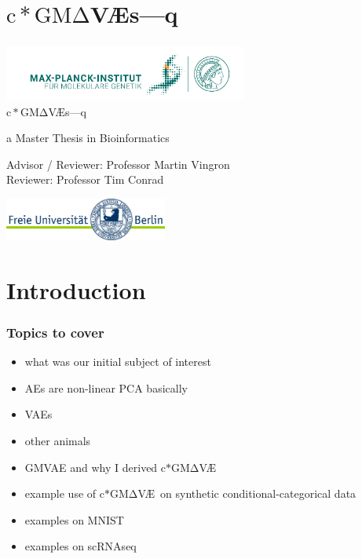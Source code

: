 \documentclass[final]{beamer}
\title{\scgmvae}{}
\author{Kolb, Yiftach}
\newcommand{\scgmvae}{$\mathrm{c}{\ast}\mathrm{GM\Delta}$V{\AE}s---q}
\newcommand{\gmvae}{c$\ast$GM$\mathrm{\Delta}$V\AE~}
\begin{document}
\maketitle

\section{\scgmvae}

\begin{frame}
\frametitle{}
\begin{center}
{\includegraphics[width=0.60\textwidth]{images/MPIMG_RGB_gruen.png}}\\
\vspace*{1cm}
\large
\scgmvae

\normalsize
a Master Thesis in Bioinformatics
\vspace{0.2cm}

Advisor / Reviewer: Professor Martin Vingron\\
Reviewer: Professor Tim Conrad

\vfill



\vfill
{\includegraphics[width=0.4\textwidth]{images/fu-logo_bildschirm_RGB1.jpg}}
\end{center}
\normalsize
\end{frame}

\section{Introduction}

\begin{frame}
\frametitle{Topics to cover}
\begin{itemize}
\item{} what was our initial subject of interest
\item{} AEs are non-linear PCA basically
\item{} VAEs
\item{} other animals
\item{} GMVAE and why I derived \gmvae
\item{} example use of \gmvae on synthetic conditional-categorical data
\item{} examples on MNIST
\item{} examples on scRNAseq
\end{itemize}
\end{frame}
\end{document}
